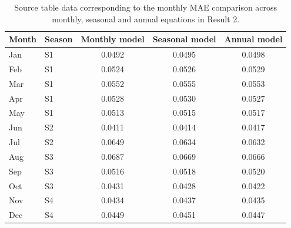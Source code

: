 \documentclass[10pt]{article}
\begin{document}
\begin{table}[htbp]
\centering
\caption{Source table data corresponding to the monthly MAE comparison across monthly, seasonal and annual equations in Result 2.}
\label{tab:monthly-seasonal-annual-mae-values}
\small
\setlength{\tabcolsep}{4.5pt}
\renewcommand{\arraystretch}{1.10}
\begin{tabular}{C{1.0cm}C{1.0cm}ccc}
\toprule
Month & Season & Monthly model & Seasonal model & Annual model \\
\midrule
Jan & S1 & 0.0492 & 0.0495 & 0.0498 \\
Feb & S1 & 0.0524 & 0.0526 & 0.0529 \\
Mar & S1 & 0.0552 & 0.0555 & 0.0553 \\
Apr & S1 & 0.0528 & 0.0530 & 0.0527 \\
May & S1 & 0.0513 & 0.0515 & 0.0517 \\
Jun & S2 & 0.0411 & 0.0414 & 0.0417 \\
Jul & S2 & 0.0649 & 0.0634 & 0.0632 \\
Aug & S3 & 0.0687 & 0.0669 & 0.0666 \\
Sep & S3 & 0.0516 & 0.0518 & 0.0520 \\
Oct & S3 & 0.0431 & 0.0428 & 0.0422 \\
Nov & S4 & 0.0434 & 0.0437 & 0.0435 \\
Dec & S4 & 0.0449 & 0.0451 & 0.0447 \\
\bottomrule
\end{tabular}
\end{table}
\end{document}
